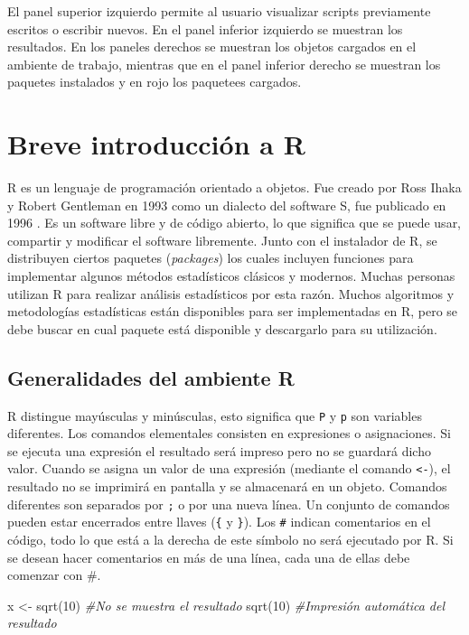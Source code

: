 \documentclass[
]{book}
\newenvironment{Shaded}{\begin{snugshade}}{\end{snugshade}}
\newcommand{\CommentTok}[1]{\textcolor[rgb]{0.56,0.35,0.01}{\textit{#1}}}
\newcommand{\DecValTok}[1]{\textcolor[rgb]{0.00,0.00,0.81}{#1}}
\newcommand{\FunctionTok}[1]{\textcolor[rgb]{0.00,0.00,0.00}{#1}}
\newcommand{\NormalTok}[1]{#1}
\newcommand{\OtherTok}[1]{\textcolor[rgb]{0.56,0.35,0.01}{#1}}
\begin{document}
El panel superior izquierdo permite al usuario visualizar scripts previamente escritos o escribir nuevos. En el panel inferior izquierdo se muestran los resultados. En los paneles derechos se muestran los objetos cargados en el ambiente de trabajo, mientras que en el panel inferior derecho se muestran los paquetes instalados y en rojo los paquetees cargados.

\hypertarget{intro}{%
\chapter{Breve introducción a R}\label{intro}}

R \citep{R-base} es un lenguaje de programación orientado a objetos. Fue creado por Ross Ihaka y Robert Gentleman en 1993 como un dialecto del software S, fue publicado en 1996 \citep{ihaka1996r}. Es un software libre y de código abierto, lo que significa que se puede usar, compartir y modificar el software libremente. Junto con el instalador de R, se distribuyen ciertos paquetes (\emph{packages}) los cuales incluyen funciones para implementar algunos métodos estadísticos clásicos y modernos. Muchas personas utilizan R para realizar análisis estadísticos por esta razón. Muchos algoritmos y metodologías estadísticas están disponibles para ser implementadas en R, pero se debe buscar en cual paquete está disponible y descargarlo para su utilización.

\hypertarget{SintaxisBasica}{%
\section{Generalidades del ambiente R}\label{SintaxisBasica}}

R distingue mayúsculas y minúsculas, esto significa que \texttt{P} y \texttt{p} son variables diferentes. Los comandos elementales consisten en expresiones o asignaciones. Si se ejecuta una expresión el resultado será impreso pero no se guardará dicho valor. Cuando se asigna un valor de una expresión (mediante el comando \texttt{\textless{}-}), el resultado no se imprimirá en pantalla y se almacenará en un objeto. Comandos diferentes son separados por \texttt{;} o por una nueva línea. Un conjunto de comandos pueden estar encerrados entre llaves (\texttt{\{} y \texttt{\}}). Los \texttt{\#} indican comentarios en el código, todo lo que está a la derecha de este símbolo no será ejecutado por R. Si se desean hacer comentarios en más de una línea, cada una de ellas debe comenzar con \#.

\begin{Shaded}
\begin{Highlighting}[]
\NormalTok{x }\OtherTok{\textless{}{-}} \FunctionTok{sqrt}\NormalTok{(}\DecValTok{10}\NormalTok{) }\CommentTok{\#No se muestra el resultado}
\FunctionTok{sqrt}\NormalTok{(}\DecValTok{10}\NormalTok{)      }\CommentTok{\#Impresión automática del resultado}
\end{Highlighting}
\end{Shaded}
\end{document}
